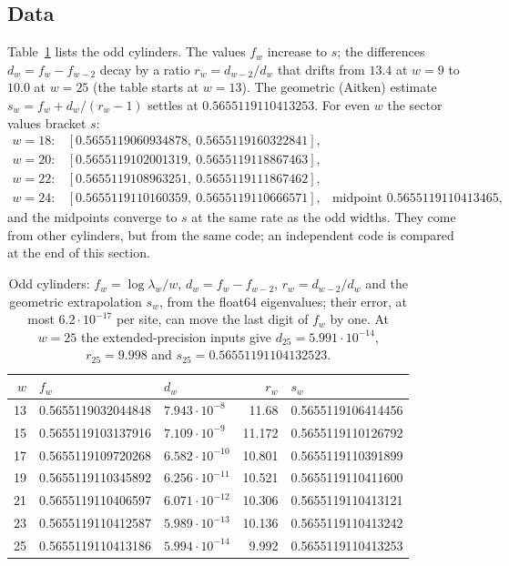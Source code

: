 \documentclass[11pt]{amsart}
\theoremstyle{definition}
\theoremstyle{remark}
\begin{document}
\subsection{Data}
Table~\ref{tab:odd} lists the odd cylinders. The values $f_w$ increase to $s$; the differences
$d_w = f_w - f_{w-2}$ decay by a ratio $r_w = d_{w-2}/d_w$ that drifts from $13.4$ at $w = 9$ to
$10.0$ at $w = 25$ (the table starts at $w = 13$).
The geometric (Aitken) estimate $s_w = f_w + d_w/(r_w - 1)$ settles at $0.5655119110413253$.
For even $w$ the sector values bracket $s$:
\[
\begin{array}{rll}
  w = 18: & [0.5655119060934878,\ 0.5655119160322841], \\
  w = 20: & [0.5655119102001319,\ 0.5655119118867463], \\
  w = 22: & [0.5655119108963251,\ 0.5655119111867462], \\
  w = 24: & [0.5655119110160359,\ 0.5655119110666571], & \text{midpoint } 0.5655119110413465,
\end{array}
\]
and the midpoints converge to $s$ at the same rate as the odd widths. They come from other
cylinders, but from the same code; an independent code is compared at the end of this section.

\begin{table}[ht]
\caption{Odd cylinders: $f_w = \log\lambda_w / w$, $d_w = f_w - f_{w-2}$, $r_w = d_{w-2}/d_w$ and the
geometric extrapolation $s_w$, from the float64 eigenvalues; their error, at most $6.2\cdot10^{-17}$
per site, can move the last digit of $f_w$ by one. At $w = 25$ the extended-precision inputs give
$d_{25} = 5.991\cdot10^{-14}$, $r_{25} = 9.998$ and $s_{25} = 0.56551191104132523$.}\label{tab:odd}
\begin{tabular}{rllrl}
\toprule
$w$ & $f_w$ & $d_w$ & $r_w$ & $s_w$ \\
\midrule
13 & 0.5655119032044848 & $7.943\cdot10^{-8}$  & 11.68 & 0.5655119106414456 \\
15 & 0.5655119103137916 & $7.109\cdot10^{-9}$  & 11.172 & 0.5655119110126792 \\
17 & 0.5655119109720268 & $6.582\cdot10^{-10}$ & 10.801 & 0.5655119110391899 \\
19 & 0.5655119110345892 & $6.256\cdot10^{-11}$ & 10.521 & 0.5655119110411600 \\
21 & 0.5655119110406597 & $6.071\cdot10^{-12}$ & 10.306 & 0.5655119110413121 \\
23 & 0.5655119110412587 & $5.989\cdot10^{-13}$ & 10.136 & 0.5655119110413242 \\
25 & 0.5655119110413186 & $5.994\cdot10^{-14}$ &  9.992 & 0.5655119110413253 \\
\bottomrule
\end{tabular}
\end{table}
\end{document}
